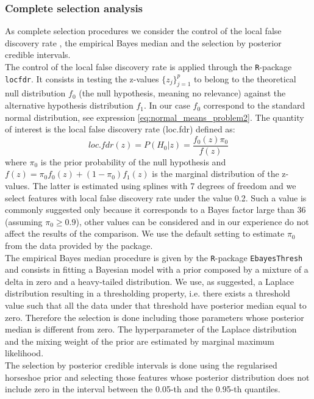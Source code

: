 \documentclass[american,]{article}
\theoremstyle{definition}
\begin{document}
\hypertarget{complete-selection}{%
\subsubsection{Complete selection analysis}\label{complete-selection}}
As complete selection procedures we consider the control of the local false discovery rate \citep{paper:efron, efron2012large}, the empirical Bayes median \citep{johnstone2004needles} and the selection by posterior credible intervals. 
\\
The control of the local false discovery rate is applied through the \texttt{R}-package \texttt{locfdr}. It consists in testing the z-values $\{z_{j}\}_{j=1}^{p}$ to belong to the theoretical null distribution $f_{0}$ (the null hypothesis, meaning no relevance) against the alternative hypothesis distribution $f_{1}$. In our case $f_{0}$ correspond to the standard normal distribution, see expression \eqref{eq:normal_means_problem2}. The quantity of interest is the local false discovery rate (loc.fdr) defined as:
\
\begin{equation}
loc.fdr(z)=P(H_{0}|z)=\frac{f_{0}(z)\pi_{0}}{f(z)}
\end{equation}
where $\pi_{0}$ is the prior probability of the null hypothesis and $f(z)=\pi_{0}f_{0}(z)+(1-\pi_{0})f_{1}(z)$ is the marginal distribution of the z-values. The latter is estimated using splines with 7 degrees of freedom and we select features with local false discovery rate under the value 0.2. Such a value is commonly suggested only because it corresponds to a Bayes factor large than 36 (assuming $\pi_{0}\geq0.9$), other values can be considered and in our experience do not affect the results of the comparison. We use the default setting to estimate $\pi_{0}$ from the data provided by the package.
\\
The empirical Bayes median procedure is given by the \texttt{R}-package \texttt{EbayesThresh} and consists in fitting a Bayesian model with a prior composed by a mixture of a delta in zero and a heavy-tailed distribution. We use, as suggested, a Laplace distribution resulting in a thresholding property, i.e. there exists a threshold value such that all the data under that threshold have posterior median equal to zero. Therefore the selection is done including those parameters whose posterior median is different from zero. The hyperparameter of the Laplace distribution and the mixing weight of the prior are estimated by marginal maximum likelihood. 
\\
The selection by posterior credible intervals is done using the regularised horseshoe prior and selecting those features whose posterior distribution does not include zero in the interval between the 0.05-th and the 0.95-th quantiles.
\end{document}

